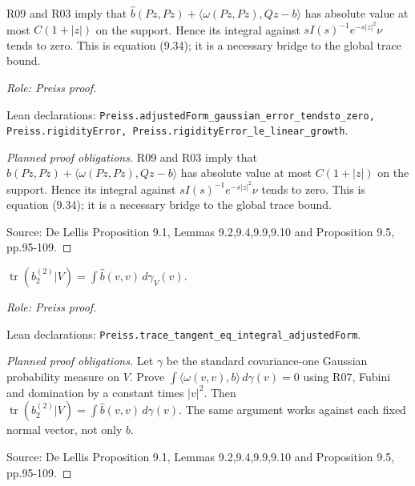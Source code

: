 \begin{lemma}
\label{lem:rigidity-rescaled-error}







R09 and R03 imply that
$\widehat b(Pz,Pz)+\langle\omega(Pz,Pz),Qz-b\rangle$
has absolute value at most $C(1+|z|)$ on the support.
Hence its integral against $sI(s)^{-1}e^{-s|z|^2}\nu$ tends to zero.
This is equation (9.34); it is a necessary bridge to the global trace bound.
\par\emph{Role: Preiss proof.}
\par Lean declarations: \texttt{Preiss.adjustedForm\_gaussian\_error\_tendsto\_zero, Preiss.rigidityError, Preiss.rigidityError\_le\_linear\_growth}.
\end{lemma}
\begin{proof}[Planned proof obligations]

R09 and R03 imply that
$\widehat b(Pz,Pz)+\langle\omega(Pz,Pz),Qz-b\rangle$
has absolute value at most $C(1+|z|)$ on the support.
Hence its integral against $sI(s)^{-1}e^{-s|z|^2}\nu$ tends to zero.
This is equation (9.34); it is a necessary bridge to the global trace bound.
\par Source: De Lellis Proposition 9.1, Lemmas 9.2,9.4,9.9,9.10 and Proposition 9.5, pp.95-109.
\end{proof}

\begin{lemma}
\label{lem:rigidity-gaussian-trace}







$\operatorname{tr}(b_2^{(2)}|V)=\int\widehat b(v,v)\,d\gamma_V(v)$.
\par\emph{Role: Preiss proof.}
\par Lean declarations: \texttt{Preiss.trace\_tangent\_eq\_integral\_adjustedForm}.
\end{lemma}
\begin{proof}[Planned proof obligations]

Let $\gamma$ be the standard covariance-one Gaussian probability measure on
$V$. Prove $\int\langle\omega(v,v),b\rangle\,d\gamma(v)=0$ using R07,
Fubini and domination by a constant times $|v|^2$.
Then
$\operatorname{tr}(b_2^{(2)}|V)=\int\widehat b(v,v)\,d\gamma(v)$.
The same argument works against each fixed normal vector, not only $b$.
\par Source: De Lellis Proposition 9.1, Lemmas 9.2,9.4,9.9,9.10 and Proposition 9.5, pp.95-109.
\end{proof}

